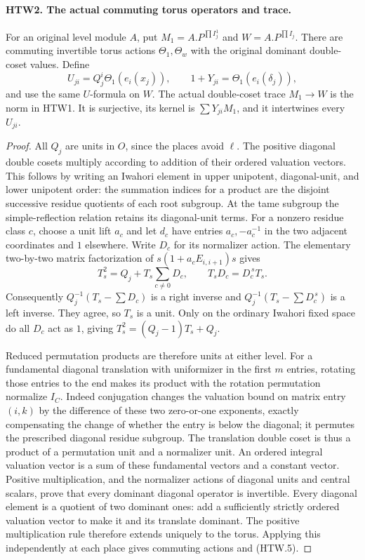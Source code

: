 \paragraph{HTW2. The actual commuting torus operators and trace.}
\label{claim:HTW2}
For an original level module \(A\), put
\(M_1=A.P^{\prod I_j^1}\) and \(W=A.P^{\prod I_j}\).
There are commuting invertible torus actions \(\Theta_1,\Theta_w\)
with the original dominant double-coset values.  Define
\[
 U_{ji}=Q_j^i\Theta_1(e_i(x_j)),\qquad
 1+Y_{ji}=\Theta_1(e_i(\delta_j)),
 \tag{HTW.5}
\]
and use the same \(U\)-formula on \(W\).  The actual
double-coset trace \(M_1\to W\) is the norm in HTW1.
It is surjective, its kernel is \(\sum Y_{ji}M_1\), and
it intertwines every \(U_{ji}\).
\begin{proof}
All \(Q_j\) are units in \(O\), since the places avoid
\(\ell\).  The positive diagonal double cosets multiply
according to addition of their ordered valuation vectors.
This follows by writing an Iwahori element in upper
unipotent, diagonal-unit, and lower unipotent order:
the summation indices for a product are the disjoint
successive residue quotients of each root subgroup.
At the tame subgroup the simple-reflection relation
retains its diagonal-unit terms.  For a nonzero residue
class \(c\), choose a unit lift \(a_c\) and let \(d_c\)
have entries \(a_c,-a_c^{-1}\) in the two adjacent
coordinates and \(1\) elsewhere.  Write \(D_c\) for
its normalizer action.  The elementary two-by-two
matrix factorization of \(s(1+a_cE_{i,i+1})s\) gives
\[
 T_s^2=Q_j+T_s\sum_{c\ne0}D_c,\qquad
       T_sD_c=D_c^{\,s}T_s .
\]
Consequently \(Q_j^{-1}(T_s-\sum D_c)\) is a right
inverse and \(Q_j^{-1}(T_s-\sum D_c^{\,s})\) is a
left inverse.  They agree, so \(T_s\) is a unit.
Only on the ordinary Iwahori fixed space do all
\(D_c\) act as \(1\), giving
\(T_s^2=(Q_j-1)T_s+Q_j\).

Reduced permutation products are therefore units at
either level.  For a fundamental diagonal translation
with uniformizer in the first \(m\) entries, rotating
those entries to the end makes its product with the
rotation permutation normalize \(I_C\).  Indeed
conjugation changes the valuation bound on matrix
entry \((i,k)\) by the difference of these two
zero-or-one exponents, exactly compensating the
change of whether the entry is below the diagonal;
it permutes the prescribed diagonal residue subgroup.
The translation double coset is thus a product of
a permutation unit and a normalizer unit.
An ordered integral valuation vector is a sum of
these fundamental vectors and a constant vector.
Positive multiplication, and the normalizer actions
of diagonal units and central scalars, prove that
every dominant diagonal operator is invertible.
Every diagonal element is a quotient of two
dominant ones: add a sufficiently strictly ordered
valuation vector to make it and its translate dominant.
The positive multiplication rule therefore extends
uniquely to the torus.  Applying this independently at
each place gives commuting actions and (HTW.5).


\end{proof}
